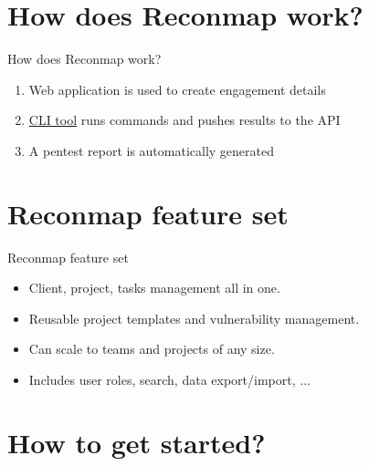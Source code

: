 \documentclass{beamer}
\begin{document}
\section{How does Reconmap work?}

\begin{frame}{How does Reconmap work?}
    \begin{enumerate}
        \item Web application is used to create engagement details
        \item \href{https://github.com/Reconmap/cli}{CLI tool} runs commands and pushes results to the API
        \item A pentest report is automatically generated
    \end{enumerate}
\end{frame}

\section{Reconmap feature set}

\begin{frame}{Reconmap feature set}
    \begin{itemize}
        \item Client, project, tasks management all in one.
        \item Reusable project templates and vulnerability management.
        \item Can scale to teams and projects of any size.
        \item Includes user roles, search, data export/import, ...
    \end{itemize}
\end{frame}

\section{How to get started?}
\end{document}
